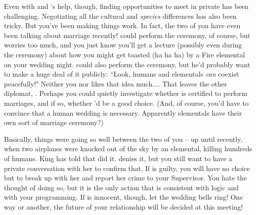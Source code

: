 \documentclass[char]{elementals}
\begin{document}
Even with \cLeader{} and \cDiplomat{}'s help, though, finding opportunities to meet \cJuliet{} in private has been challenging.  Negotiating all the cultural and \emph{species} differences has also been tricky.   But you've been making things work.  In fact, the two of you have even been talking about marriage recently!  \cLeader{} could perform the ceremony, of course, but  \cLeader{\they} worries too much, and you just know you'll get a lecture (possibly even during the ceremony) about how you might get toasted (ha ha ha) by a Fire elemental on your wedding night.  \cDiplomat{} could also perform the ceremony, but he'd probably want to make a huge deal of it publicly: ``Look, humans and elementals \emph{can} coexist peacefully!"  Neither you nor \cJuliet{} likes that idea much....  That leaves the other diplomat, \cAvatar{\full}.  Perhaps you could quietly investigate whether \cAvatar{\they} is certified to perform marriages, and if so, whether \cAvatar{\they}'d be a good choice.  (And, of course, you'd have to convince \cJuliet{} that a human wedding is necessary.  Apparently elementals have their own sort of marriage ceremony?)

Basically, things were going so well between the two of you -- up until recently, when two airplanes were knocked out of the sky by an elemental, killing hundreds of humans.  King \cKing{} has told \cLeader{} that \cJuliet{} did it.  \cJuliet{\They} denies it, but you still want to have a private conversation with her to confirm that.  If \cJuliet{\they} is guilty, you will have no choice but to break up with her and report her crime to your Supervisor.  You hate the thought of doing so, but it is the only action that is consistent with logic and with your programming.  If \cJuliet{} is innocent, though, let the wedding bells ring!  One way or another, the future of your relationship will be decided at this meeting!
\end{document}
